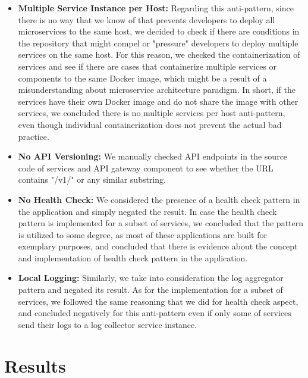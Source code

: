 \documentclass{Configuration_Files/PoliMi3i_thesis}
\begin{document}
\begin{itemize}
\begin{itemize}
        \item \textbf{Multiple Service Instance per Host:} Regarding this anti-pattern, since there is no way that we know of that prevents developers to deploy all microservices to the same host, we decided to check if there are conditions in the repository that might compel or "pressure" developers to deploy multiple services on the same host.
        For this reason, we checked the containerization of services and see if there are cases that containerize multiple services or components to the same Docker image, which might be a result of a misunderstanding about microservice architecture paradigm.
        In short, if the services have their own Docker image and do not share the image with other services, we concluded there is no multiple services per host anti-pattern, even though individual containerization does not prevent the actual bad practice.
        
        \item \textbf{No API Versioning:} We manually checked API endpoints in the source code of services and API gateway component to see whether the URL contains "/v1/" or any similar substring.
        
        \item \textbf{No Health Check:} We considered the presence of a health check pattern in the application and simply negated the result.
        In case the health check pattern is implemented for a subset of services, we concluded that the pattern is utilized to some degree, as most of these applications are built for exemplary purposes, and concluded that there is evidence about the concept and implementation of health check pattern in the application.
        
        \item \textbf{Local Logging:} Similarly, we take into consideration the log aggregator pattern and negated its result.
        As for the implementation for a subset of services, we followed the same reasoning that we did for health check aspect,
        and concluded negatively for this anti-pattern even if only some of services send their logs to a log collector service instance.
    \end{itemize}
    
    
\end{itemize}


\chapter{Results}
\label{ch:results}%
\end{document}
